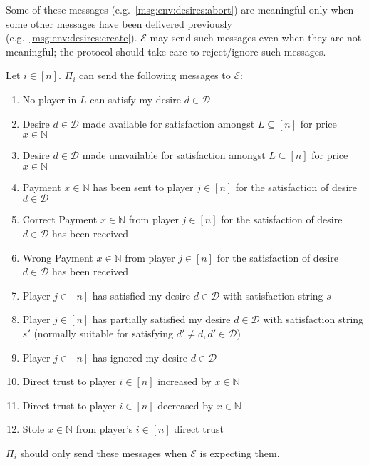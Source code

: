   Some of these messages (e.g.~\ref{msg:env:desires:abort}) are meaningful only when some
  other messages have been delivered previously (e.g.~\ref{msg:env:desires:create}).
  $\mathcal{E}$ may send such messages even when they are not meaningful; the protocol
  should take care to reject/ignore such messages.

  Let $i \in \left[n\right]$. $\Pi_i$ can send the following messages to $\mathcal{E}$:
  \begin{enumerate}
    \item No player in $L$ can satisfy my desire $d \in \mathcal{D}$
    \item Desire $d \in \mathcal{D}$ made available for satisfaction amongst $L \subseteq
    \left[n\right]$ for price $x \in \mathbb{N}$
    \item Desire $d \in \mathcal{D}$ made unavailable for satisfaction amongst $L \subseteq
    \left[n\right]$ for price $x \in \mathbb{N}$
    \item Payment $x \in \mathbb{N}$ has been sent to player $j \in \left[n\right]$ for
    the satisfaction of desire $d \in \mathcal{D}$
    \item Correct Payment $x \in \mathbb{N}$ from player $j \in \left[n\right]$ for
    the satisfaction of desire $d \in \mathcal{D}$ has been received
    \item Wrong Payment $x \in \mathbb{N}$ from player $j \in \left[n\right]$ for
    the satisfaction of desire $d \in \mathcal{D}$ has been received
    \item Player $j \in \left[n\right]$ has satisfied my desire $d \in \mathcal{D}$ with
    satisfaction string $s$
    \item Player $j \in \left[n\right]$ has partially satisfied my desire $d \in
    \mathcal{D}$ with satisfaction string $s'$ (normally suitable for satisfying $d' \neq
    d, d' \in \mathcal{D}$)
    \item Player $j \in \left[n\right]$ has ignored my desire $d \in \mathcal{D}$
    \item Direct trust to player $i \in \left[n\right]$ increased by $x \in \mathbb{N}$
    \item Direct trust to player $i \in \left[n\right]$ decreased by $x \in \mathbb{N}$
    \item Stole $x \in \mathbb{N}$ from player's $i \in \left[n\right]$ direct trust
  \end{enumerate}
  $\Pi_i$ should only send these messages when $\mathcal{E}$ is expecting them.

